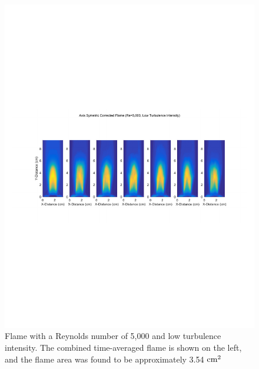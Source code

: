 \documentclass[12pt]{ussci} %
\begin{document}
\begin{appendices}
\begin{figure}[ht]
\centering
\includegraphics[width=.95\textwidth]{Re5kLow.pdf}
\caption{Flame with a Reynolds number of 5,000 and low turbulence intensity.  The combined time-averaged flame is shown on the left, and the flame area was found to be approximately 3.54 $\textnormal{cm}^2$}
\label{fig:5low}
\end{figure}


\end{appendices}
\end{document}
